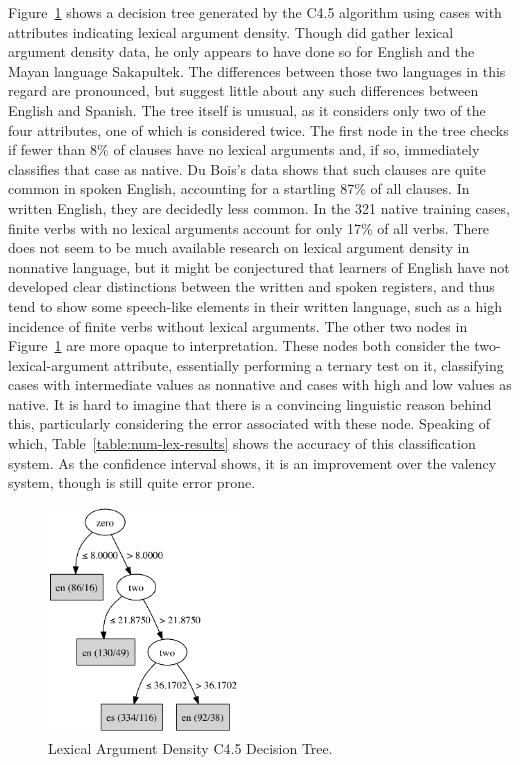 \documentclass[main.tex]{subfiles}
\begin{document}
Figure~\ref{fig:c4.5-num-lex} shows a decision tree generated by the C4.5 algorithm using cases with attributes indicating lexical argument density. Though \citet{dubois:2003} did gather lexical argument density data, he only appears to have done so for English and the Mayan language Sakapultek. The differences between those two languages in this regard are pronounced, but suggest little about any such differences between English and Spanish. The tree itself is unusual, as it considers only two of the four attributes, one of which is considered twice. The first node in the tree checks if fewer than 8\% of clauses have no lexical arguments and, if so, immediately classifies that case as native. Du Bois's data shows that such clauses are quite common in spoken English, accounting for a startling 87\% of all clauses. In written English, they are decidedly less common. In the 321 native training cases, finite verbs with no lexical arguments account for only 17\% of all verbs. There does not seem to be much available research on lexical argument density in nonnative language, but it might be conjectured that learners of English have not developed clear distinctions between the written and spoken registers, and thus tend to show some speech-like elements in their written language, such as a high incidence of finite verbs without lexical arguments. The other two nodes in Figure~\ref{fig:c4.5-num-lex} are more opaque to interpretation. These nodes both consider the two-lexical-argument attribute, essentially performing a ternary test on it, classifying cases with intermediate values as nonnative and cases with high and low values as native. It is hard to imagine that there is a convincing linguistic reason behind this, particularly considering the error associated with these node. Speaking of which, Table~\ref{table:num-lex-results} shows the accuracy of this classification system. As the confidence interval shows, it is an improvement over the valency system, though is still quite error prone.

\begin{figure}[ht]
\centering
\includegraphics[width=2in]{c45-num-lex.pdf}
\caption{Lexical Argument Density C4.5 Decision Tree.}
\label{fig:c4.5-num-lex}
\end{figure}
\end{document}
